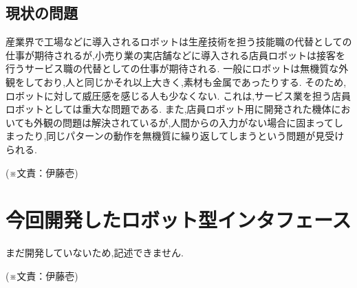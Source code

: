 \subsection{現状の問題}
%
%
産業界で工場などに導入されるロボットは生産技術を担う技能職の代替としての仕事が期待されるが,小売り業の実店舗などに導入される店員ロボットは接客を行うサービス職の代替としての仕事が期待される.
一般にロボットは無機質な外観をしており,人と同じかそれ以上大きく,素材も金属であったりする.
そのため,ロボットに対して威圧感を感じる人も少なくない.
これは,サービス業を担う店員ロボットとしては重大な問題である.
また,店員ロボット用に開発された機体においても外観の問題は解決されているが,人間からの入力がない場合に固まってしまったり,同じパターンの動作を無機質に繰り返してしまうという問題が見受けられる.
\begin{flushright}
(※文責：伊藤壱)
\end{flushright}
\begin{comment}
現在の該当分野や類似プロジェクトの状況を記述する.
昨年のテーマを引き継いでいるプロジェクトでは、昨年の内容も記述する.
\end{comment}
%
%

%
%
\begin{comment}
目的を妨げている問題(現在の該当分野や類似プロジェクトの問題点)を記述する.
\end{comment}
\begin{comment}
1.4節の従来の問題点の中から,解決すべき問題を明示し,その問題を解決するために設定された課題(解決すべき問題を具体的に記述したもの)の概略を記述する.
\end{comment}
%
%
\section{今回開発したロボット型インタフェース}
まだ開発していないため,記述できません.
\begin{flushright}
(※文責：伊藤壱)
\end{flushright}
